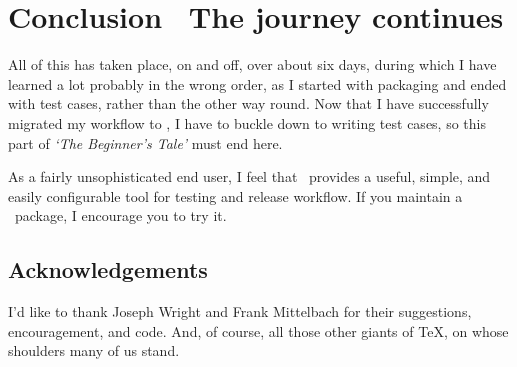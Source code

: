 \section{Conclusion \Dash\ The journey continues}
\label{sec:journey-continues}

All of this has taken place,
on and off,  
over about six days, during which
I have learned a lot \Dash probably in the wrong order, 
as I started with packaging and ended with test cases,
rather than the other way round. 
Now that I have successfully migrated my workflow to \lbuild,
I have to buckle down to writing test cases,
so this part of \textit{`The Beginner's Tale'} must end here.

As a fairly unsophisticated end user, 
I feel that \lbuild\ provides a useful, 
simple, and easily configurable tool 
for testing and release workflow.
If you maintain a \CTAN\ package, 
I encourage you to try it.

\subsection*{Acknowledgements}
\label{sec:acknowledgements}

I'd like to thank Joseph Wright and Frank Mittelbach
for their suggestions, encouragement, and code.
And, of course, all those other giants of \TeX,
on whose shoulders many of us stand.


\makesignature

